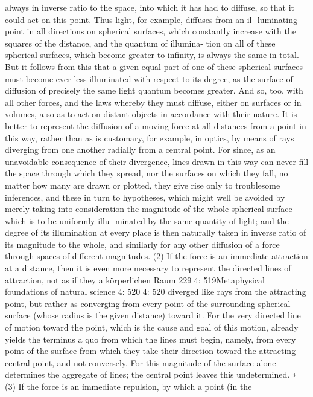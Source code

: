 always in inverse ratio to the space, into which it has had to diffuse, so
that it could act on this point. Thus light, for example, diffuses from an il-
luminating point in all directions on spherical surfaces, which constantly
increase with the squares of the distance, and the quantum of illumina-
tion on all of these spherical surfaces, which become greater to inﬁnity,
is always the same in total. But it follows from this that a given equal
part of one of these spherical surfaces must become ever less illuminated
with respect to its degree, as the surface of diffusion of precisely the same
light quantum becomes greater. And so, too, with all other forces, and
the laws whereby they must diffuse, either on surfaces or in volumes, a so
as to act on distant objects in accordance with their nature. It is better to
represent the diffusion of a moving force at all distances from a point in
this way, rather than as is customary, for example, in optics, by means of
rays diverging from one another radially from a central point. For since,
as an unavoidable consequence of their divergence, lines drawn in this
way can never ﬁll the space through which they spread, nor the surfaces
on which they fall, no matter how many are drawn or plotted, they give
rise only to troublesome inferences, and these in turn to hypotheses,
which might well be avoided by merely taking into consideration the
magnitude of the whole spherical surface – which is to be uniformly illu-
minated by the same quantity of light; and the degree of its illumination
at every place is then naturally taken in inverse ratio of its magnitude to
the whole, and similarly for any other diffusion of a force through spaces
of different magnitudes.
(2) If the force is an immediate attraction at a distance, then it is even
more necessary to represent the directed lines of attraction, not as if they
a
körperlichen Raum
229
4: 519Metaphysical foundations of natural science
4: 520
4: 520
diverged like rays from the attracting point, but rather as converging
from every point of the surrounding spherical surface (whose radius is
the given distance) toward it. For the very directed line of motion toward
the point, which is the cause and goal of this motion, already yields the
terminus a quo from which the lines must begin, namely, from every
point of the surface from which they take their direction toward the
attracting central point, and not conversely. For this magnitude of the
surface alone determines the aggregate of lines; the central point leaves
this undetermined. ∗
(3) If the force is an immediate repulsion, by which a point (in the
